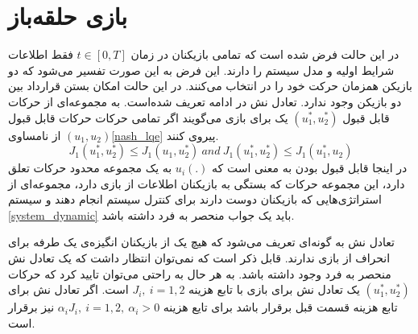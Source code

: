 \section{بازی حلقه‌باز}
در این حالت فرض شده است که تمامی بازیکنان در زمان 
$t \in [0, T]$
فقط اطلاعات شرایط اولیه و مدل سیستم را دارند. این فرض به این صورت تفسیر می‌شود که دو بازیکن همزمان حرکت خود را در انتخاب می‌کنند. در این حالت امکان بستن قرارداد بین دو بازیکن وجود ندارد. تعادل نش در ادامه تعریف شده‌است.
به مجموعه‌ای از حرکات قابل قبول 
$(u_1^*, u_2^*)$
یک  برای بازی می‌گویند اگر تمامی حرکات حرکات قابل قبول 
$(u_1, u_2)$
از نامساوی\ref{nash_lqe} پیروی کنند.
\begin{equation}\label{nash_lqe}
	J_1(u_1^*, u_2^*)\leq J_1(u_1, u_2^*)~ and~
	J_1(u_1^*, u_2^*)\leq J_1(u_1^*, u_2)
\end{equation}
در اینجا قابل قبول بودن به معنی است که
$u_i(.)$
به یک مجموعه محدود حرکات تعلق دارد، این مجموعه حرکات که بستگی به بازیکنان اطلاعات از بازی دارد، مجموعه‌ای از استراتژی‌هایی که بازیکنان دوست دارند برای کنترل سیستم انجام دهند و سیستم 
\ref{system_dynamic}
باید یک جواب منحصر به فرد داشته باشد. 


تعادل نش به گونه‌ای تعریف می‌شود که هیچ یک از بازیکنان انگیزه‌ی یک طرفه برای انحراف از بازی ندارند. قابل ذکر است که نمی‌توان انتظار داشت که یک تعادل نش منحصر به فرد وجود داشته باشد. به هر حال به راحتی می‌توان تایید کرد که حرکات
$(u_1^*, u_2^*)$
یک تعادل نش برای بازی با تابع هزینه
$J_i,~ i = 1, 2$
است. اگر تعادل نش برای تابع هزینه قسمت قبل برقرار باشد برای تایع هزینه
$\alpha_iJ_i,~ i = 1, 2, ~\alpha_i>0$
نیز برقرار است.


